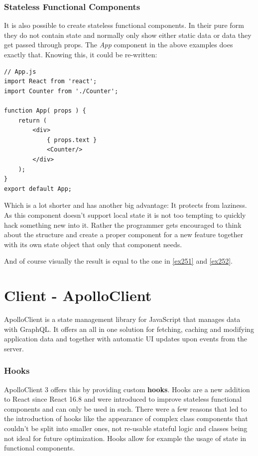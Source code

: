 \subsubsection{Stateless Functional Components}
It is also possible to create stateless functional components. In their pure form they do not contain state and normally only show either static data or data they get passed through props. The \emph{App} component in the above examples does exactly that. Knowing this, it could be re-written:
\begin{lstlisting}[caption={App as Functional Component}]
// App.js
import React from 'react';
import Counter from './Counter';

function App( props ) {
	return (
		<div>
			{ props.text }
			<Counter/>
		</div>
	);
}
export default App;
\end{lstlisting}
Which is a lot shorter and has another big advantage: It protects from laziness. \cite{CoryHouse} As this component doesn't support local state it is not too tempting to quickly hack something new into it. Rather the programmer gets encouraged to think about the structure and create a proper component for a new feature together with its own state object that only that component needs.

And of course visually the result is equal to the one in \autoref{ex251} and \autoref{ex252}.

\newpage
\section{Client - ApolloClient}
ApolloClient is a state management library for JavaScript that manages data with GraphQL. It offers an all in one solution for fetching, caching and modifying application data and together with automatic UI updates upon events from the server. \cite{ApolloClientIntro}

\subsubsection{Hooks}
ApolloClient 3 offers this by providing custom \textbf{hooks}. Hooks are a new addition to React since React 16.8 and were introduced to improve stateless functional components \cite{ReactHooksIntro} and can only be used in such. \cite{ReactHooksOverview} There were a few reasons that led to the introduction of hooks like the appearance of complex class components that couldn't be split into smaller ones, not re-usable stateful logic and classes being not ideal for future optimization. \cite{ReactHooksIntro} Hooks allow for example the usage of state in functional components.

